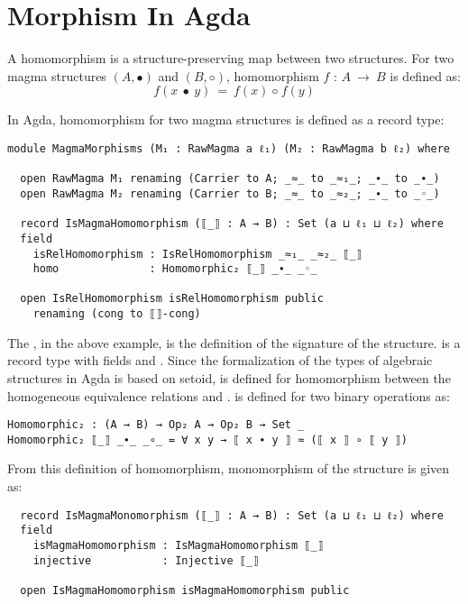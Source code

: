 \section{Morphism In Agda}
A homomorphism is a structure-preserving map between two structures.  For two
magma structures $(A,∙)$ and $(B,◦)$, homomorphism  \(f\) : \(A \ \rightarrow
\ B\) is defined as:
\[f(x\  ∙ \  y) \ = \ f(x) \ ◦ \  f(y)\] 

In Agda, homomorphism for two magma structures is defined as a record type:

\begin{verbatim}
module MagmaMorphisms (M₁ : RawMagma a ℓ₁) (M₂ : RawMagma b ℓ₂) where

  open RawMagma M₁ renaming (Carrier to A; _≈_ to _≈₁_; _∙_ to _∙_)
  open RawMagma M₂ renaming (Carrier to B; _≈_ to _≈₂_; _∙_ to _◦_)

  record IsMagmaHomomorphism (⟦_⟧ : A → B) : Set (a ⊔ ℓ₁ ⊔ ℓ₂) where
  field
    isRelHomomorphism : IsRelHomomorphism _≈₁_ _≈₂_ ⟦_⟧
    homo              : Homomorphic₂ ⟦_⟧ _∙_ _◦_

  open IsRelHomomorphism isRelHomomorphism public
    renaming (cong to ⟦⟧-cong)
\end{verbatim}

The , in the above example,  is the
definition of the signature of the structure.  is a
record type with fields  and . Since the
formalization of the types of algebraic structures in Agda is based on setoid,
 is defined for homomorphism between the homogeneous
equivalence relations  and .  is
defined for two binary operations as:

\begin{verbatim}
Homomorphic₂ : (A → B) → Op₂ A → Op₂ B → Set _
Homomorphic₂ ⟦_⟧ _∙_ _∘_ = ∀ x y → ⟦ x ∙ y ⟧ ≈ (⟦ x ⟧ ∘ ⟦ y ⟧)
\end{verbatim}

From this definition of homomorphism, monomorphism of the structure is given as:

\begin{verbatim}
  record IsMagmaMonomorphism (⟦_⟧ : A → B) : Set (a ⊔ ℓ₁ ⊔ ℓ₂) where
  field
    isMagmaHomomorphism : IsMagmaHomomorphism ⟦_⟧
    injective           : Injective ⟦_⟧

  open IsMagmaHomomorphism isMagmaHomomorphism public
\end{verbatim}

